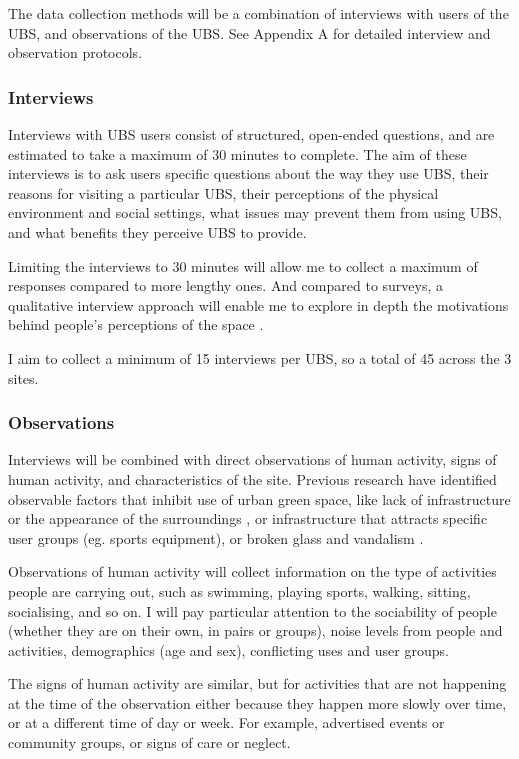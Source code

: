 \documentclass{article}
\begin{document}
The data collection methods will be a combination of interviews with users of the UBS, and observations of the UBS. See Appendix A for detailed interview and observation protocols.

\subsubsection{Interviews}

Interviews with UBS users consist of structured, open-ended questions, and are estimated to take a maximum of 30 minutes to complete. The aim of these interviews is to ask users specific questions about the way they use UBS, their reasons for visiting a particular UBS, their perceptions of the physical environment and social settings, what issues may prevent them from using UBS, and what benefits they perceive UBS to provide.

Limiting the interviews to 30 minutes will allow me to collect a maximum of responses compared to more lengthy ones. And compared to surveys, a qualitative interview approach will enable me to explore in depth the motivations behind people's perceptions of the space \parencite{noel2021social}.

I aim to collect a minimum of 15 interviews per UBS, so a total of 45 across the 3 sites.

\subsubsection{Observations}

Interviews will be combined with direct observations of human activity, signs of human activity, and characteristics of the site. Previous research have identified observable factors that inhibit use of urban green space, like lack of infrastructure or the appearance of the surroundings \parencite{raymond2016integrating}, or infrastructure that attracts specific user groups (eg. sports equipment), or broken glass and vandalism \parencite{noel2021social}.

Observations of human activity will collect information on the type of activities people are carrying out, such as swimming, playing sports, walking, sitting, socialising, and so on. I will pay particular attention to the sociability of people (whether they are on their own, in pairs or groups), noise levels from people and activities, demographics (age and sex), conflicting uses and user groups.

The signs of human activity are similar, but for activities that are not happening at the time of the observation either because they happen more slowly over time, or at a different time of day or week. For example, advertised events or community groups, or signs of care or neglect.
\end{document}
